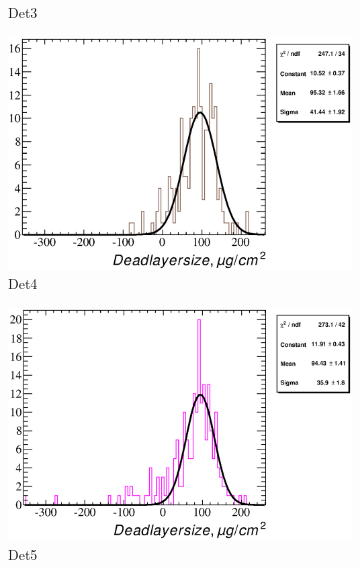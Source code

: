 \documentclass[a4paper,12pt]{article}
\begin{document}
\begin{figure}
\begin{subfigure}[b]{0.325\textwidth}
\caption{Det3}
\end{subfigure}
\begin{subfigure}[b]{0.325\textwidth}
\includegraphics[width=\textwidth]{gfx/run13_alpha_study/B2D/c_hDeadLayerSize_by_run_distribution4_B2D.eps}
\caption{Det4}
\end{subfigure}
\hfill
\begin{subfigure}[b]{0.325\textwidth}
\includegraphics[width=\textwidth]{gfx/run13_alpha_study/B2D/c_hDeadLayerSize_by_run_distribution5_B2D.eps}
\caption{Det5}
\end{subfigure}
\hfill
\begin{subfigure}[b]{0.325\textwidth}

\end{subfigure}
\end{figure}
\end{document}
